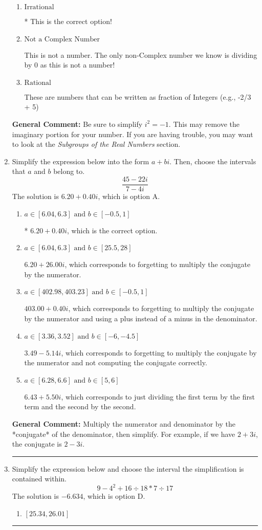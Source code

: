 \documentclass{extbook}[14pt]
\newcommand{\litem}[1]{\item #1

\rule{\textwidth}{0.4pt}}
\begin{document}
\begin{enumerate}
{\begin{enumerate}[label=\Alph*.]
This is a Complex number $(a+bi)$ that is not Real (has $i$ as part of the number).
\item \( \text{Irrational} \)

* This is the correct option!
\item \( \text{Not a Complex Number} \)

This is not a number. The only non-Complex number we know is dividing by 0 as this is not a number!
\item \( \text{Rational} \)

These are numbers that can be written as fraction of Integers (e.g., -2/3 + 5)
\end{enumerate}

\textbf{General Comment:} Be sure to simplify $i^2 = -1$. This may remove the imaginary portion for your number. If you are having trouble, you may want to look at the \textit{Subgroups of the Real Numbers} section.
}
\litem{
Simplify the expression below into the form $a+bi$. Then, choose the intervals that $a$ and $b$ belong to.
\[ \frac{45 - 22 i}{7 - 4 i} \]The solution is \( 6.20  + 0.40 i \), which is option A.\begin{enumerate}[label=\Alph*.]
\item \( a \in [6.04, 6.3] \text{ and } b \in [-0.5, 1] \)

* $6.20  + 0.40 i$, which is the correct option.
\item \( a \in [6.04, 6.3] \text{ and } b \in [25.5, 28] \)

 $6.20  + 26.00 i$, which corresponds to forgetting to multiply the conjugate by the numerator.
\item \( a \in [402.98, 403.23] \text{ and } b \in [-0.5, 1] \)

 $403.00  + 0.40 i$, which corresponds to forgetting to multiply the conjugate by the numerator and using a plus instead of a minus in the denominator.
\item \( a \in [3.36, 3.52] \text{ and } b \in [-6, -4.5] \)

 $3.49  - 5.14 i$, which corresponds to forgetting to multiply the conjugate by the numerator and not computing the conjugate correctly.
\item \( a \in [6.28, 6.6] \text{ and } b \in [5, 6] \)

 $6.43  + 5.50 i$, which corresponds to just dividing the first term by the first term and the second by the second.
\end{enumerate}

\textbf{General Comment:} Multiply the numerator and denominator by the *conjugate* of the denominator, then simplify. For example, if we have $2+3i$, the conjugate is $2-3i$.
}
\litem{
Simplify the expression below and choose the interval the simplification is contained within.
\[ 9 - 4^2 + 16 \div 18 * 7 \div 17 \]The solution is \( -6.634 \), which is option D.\begin{enumerate}[label=\Alph*.]
\item \( [25.34, 26.01] \)


\end{enumerate}}
\end{enumerate}
\end{document}

